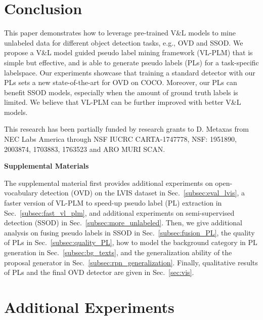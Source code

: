 \documentclass[runningheads]{llncs}
\begin{document}
\section{Conclusion}

This paper demonstrates how to leverage pre-trained V\&L models to mine unlabeled data for different object detection tasks, e.g., OVD and SSOD.  We propose a V\&L model guided pseudo label mining framework (VL-PLM) that is simple but effective, and is able to generate pseudo labels (PLs) for a task-specific labelspace. Our experiments showcase that training a standard detector with our PLs sets a new state-of-the-art for OVD on COCO. Moreover, our PLs can benefit SSOD models, especially when the amount of ground truth labels is limited. We believe that VL-PLM can be further improved with better V\&L models.


\vspace{1mm}
This research has been partially funded by research grants to D. Metaxas from
NEC Labs America through NSF IUCRC CARTA-1747778, NSF: 1951890, 2003874, 1703883, 1763523 and ARO MURI SCAN.





\newpage
\begin{center}
\textbf{\Large Supplemental Materials}
\end{center}

\appendix

\noindent
The supplemental material first provides additional experiments on open-vocabulary detection (OVD) on the LVIS dataset in Sec.~\ref{subsec:eval_lvis}, a faster version of VL-PLM to speed-up pseudo label (PL) extraction in Sec.~\ref{subsec:fast_vl_plm}, and additional experiments on semi-supervised detection (SSOD) in Sec.~\ref{subsec:more_unlabeled}.
Then, we give additional analysis on fusing pseudo labels in SSOD in Sec.~\ref{subsec:fusion_PL}, the quality of PLs in Sec.~\ref{subsec:quality_PL}, how to model the background category in PL generation in Sec.~\ref{subsec:bg_texts}, and the generalization ability of the proposal generator in Sec.~\ref{subsec:rpn_generalization}.
Finally, qualitative results of PLs and the final OVD detector are given in Sec.~\ref{sec:vis}.

\section{Additional Experiments}
\end{document}
